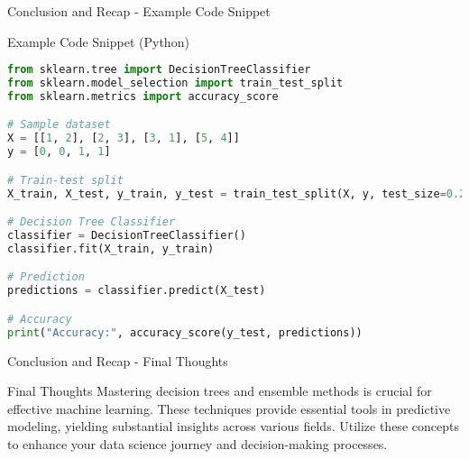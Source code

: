 \documentclass[aspectratio=169]{beamer}
\begin{document}
\begin{frame}[fragile]{Conclusion and Recap - Example Code Snippet}
    \begin{block}{Example Code Snippet (Python)}
    \begin{lstlisting}[language=Python]
from sklearn.tree import DecisionTreeClassifier
from sklearn.model_selection import train_test_split
from sklearn.metrics import accuracy_score

# Sample dataset
X = [[1, 2], [2, 3], [3, 1], [5, 4]]
y = [0, 0, 1, 1]

# Train-test split
X_train, X_test, y_train, y_test = train_test_split(X, y, test_size=0.25)

# Decision Tree Classifier
classifier = DecisionTreeClassifier()
classifier.fit(X_train, y_train)

# Prediction
predictions = classifier.predict(X_test)

# Accuracy
print("Accuracy:", accuracy_score(y_test, predictions))
    \end{lstlisting}
    \end{block}
\end{frame}

\begin{frame}[fragile]{Conclusion and Recap - Final Thoughts}
    \begin{block}{Final Thoughts}
        Mastering decision trees and ensemble methods is crucial for effective machine learning. These techniques provide essential tools in predictive modeling, yielding substantial insights across various fields. Utilize these concepts to enhance your data science journey and decision-making processes.
    \end{block}
\end{frame}
\end{document}
